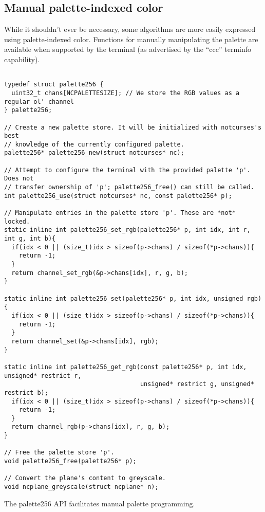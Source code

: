 \subsection{Manual palette-indexed color}
\label{sec:palettes}
While it shouldn't ever be necessary, some algorithms are more easily expressed
using palette-indexed color. Functions for manually manipulating the palette
are available when supported by the terminal (as advertised by the ``ccc''
terminfo capability).
\begin{listing}[!htb]
\begin{verbatim}

typedef struct palette256 {
  uint32_t chans[NCPALETTESIZE]; // We store the RGB values as a regular ol' channel
} palette256;

// Create a new palette store. It will be initialized with notcurses's best
// knowledge of the currently configured palette.
palette256* palette256_new(struct notcurses* nc);

// Attempt to configure the terminal with the provided palette 'p'. Does not
// transfer ownership of 'p'; palette256_free() can still be called.
int palette256_use(struct notcurses* nc, const palette256* p);

// Manipulate entries in the palette store 'p'. These are *not* locked.
static inline int palette256_set_rgb(palette256* p, int idx, int r, int g, int b){
  if(idx < 0 || (size_t)idx > sizeof(p->chans) / sizeof(*p->chans)){
    return -1;
  }
  return channel_set_rgb(&p->chans[idx], r, g, b);
}

static inline int palette256_set(palette256* p, int idx, unsigned rgb){
  if(idx < 0 || (size_t)idx > sizeof(p->chans) / sizeof(*p->chans)){
    return -1;
  }
  return channel_set(&p->chans[idx], rgb);
}

static inline int palette256_get_rgb(const palette256* p, int idx, unsigned* restrict r,
                                     unsigned* restrict g, unsigned* restrict b);
  if(idx < 0 || (size_t)idx > sizeof(p->chans) / sizeof(*p->chans)){
    return -1;
  }
  return channel_rgb(p->chans[idx], r, g, b);
}

// Free the palette store 'p'.
void palette256_free(palette256* p);

// Convert the plane's content to greyscale.
void ncplane_greyscale(struct ncplane* n);
\end{verbatim}
\caption{The palette256 API facilitates manual palette programming.}
\label{list:palette256}
\end{listing}
